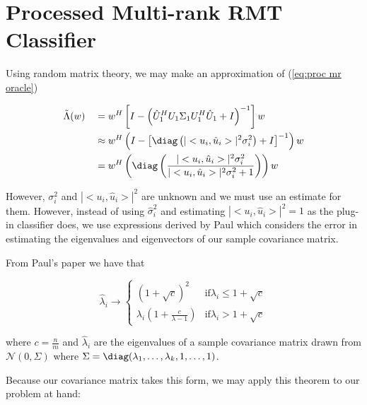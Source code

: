 \documentclass[english]{article}
\begin{document}
\section*{Processed Multi-rank RMT Classifier}

Using random matrix theory, we may make an approximation of (\ref{eq:proc mr oracle})

\begin{equation}
\begin{aligned}
&\tilde{\Lambda}(w)
&&= w^H\left[I-\left(\hat{U}_1^HU_1\Sigma_1U_1^H\hat{U}_1+I\right)^{-1}\right]w\\
&&&\approx w^H\left(I-\left[\diag\left(|<u_i,\hat{u}_i>|^2\sigma_i^2\right)+I\right]^{-1}\right)w\\
&&&=w^H\left(\diag\left(\frac{|<u_i,\hat{u}_i>|^2\sigma_i^2}{|<u_i,\hat{u}_i>|^2\sigma_i^2 + 1}\right)\right)w
\end{aligned}
\end{equation}

However, $\sigma_i^2$ and $|<u_i,\hat{u}_i>|^2$ are unknown and we must use an estimate for them. However, instead of using $\hat{\sigma}_i^2$ and estimating $|<u_i,\hat{u}_i>|^2=1$ as the plug-in classifier does, we use expressions derived by Paul which considers the error in estimating the eigenvalues and eigenvectors of our sample covariance matrix.

From Paul's paper we have that

\begin{equation}
\hat{\lambda}_i \to 
\begin{cases}
\left(1+\sqrt{c}\right)^2 & \text{if} \lambda_i\leq 1+\sqrt{c}\\
\lambda_i\left(1+\frac{c}{\lambda-1}\right) & \text{if} \lambda_i>1+\sqrt{c}
\end{cases}
\end{equation}

where $c=\frac{n}{m}$ and $\hat{\lambda}_i$ are the eigenvalues of a sample covariance matrix drawn from $\mathcal{N}(0,\Sigma)$ where $\Sigma=\diag(\lambda_1,\dots,\lambda_k,1,\dots,1)$.

Because our covariance matrix takes this form, we may apply this theorem to our problem at hand:
\end{document}
